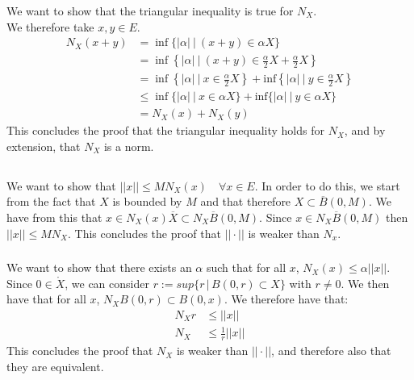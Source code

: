 \documentclass{article}
\begin{document}
\subsubsection{}%

We want to show that the triangular inequality is true for $N_X$.\\ 
We therefore take $x,y \in E$.
\begin{align*}
N_X(x+y) &= \inf\{|\alpha| \ | \ (x+y) \in \alpha X\}\\
&= \inf\left\{|\alpha| \ | \ (x+y) \in \frac{\alpha}{2} X+ \frac{\alpha}{2} X\right\}\\
&= \inf\left\{|\alpha| \ | \ x \in \frac{\alpha}{2}  X\right\} +  \textrm{inf}\left\{|\alpha| \ | \ y\in \frac{\alpha}{2}  X\right\}\\
&\leq \inf\{|\alpha| \ | \ x\in \alpha X\} + \textrm{inf}\{|\alpha| \ | \ y\in \alpha X\}\\
&= N_X(x) + N_X(y)
\end{align*}
This concludes the proof that the triangular inequality holds for $N_X$, and by extension, that $N_X$ is a norm.

\subsection{} %

\subsubsection{} %

We want to show that $||x|| \leq MN_X(x) \quad \forall x \in E$. In order to do this, we start from the fact that $X$ is bounded by $M$ and that therefore $X \subset \overline{B}(0,M)$. We have from this that $x \in N_X(x)\overline{X} \subset N_X\overline{B}(0,M)$. Since $x \in N_X\overline{B}(0,M)$ then $||x|| \leq MN_X$. This concludes the proof that $|| \cdot ||$ is weaker than $N_x$.

\subsubsection{} %

We want to show that there exists an $\alpha$ such that for all $x$, $N_X(x) \leq \alpha ||x||$.
Since $0 \in \mathring{X}$, we can consider $r := sup\{r \, | \, B(0,r) \subset X \}$ with $r \neq 0$. We then have that for all $x$, $N_XB(0,r) \subset B(0,x)$. We therefore have that:
\begin{align*}
	N_Xr &\leq ||x||\\
	N_X &\leq \frac{1}{r}||x||
\end{align*}
This concludes the proof that $N_X$ is weaker than $|| \cdot ||$, and therefore also that they are equivalent.
\end{document}

